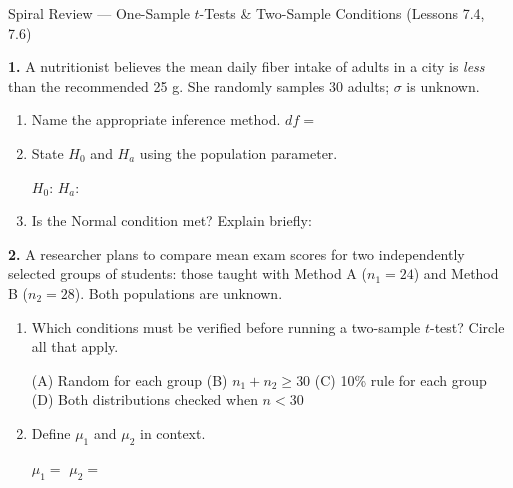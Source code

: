 \documentclass[10pt]{article}
\begin{document}
\namedateperiod

\vspace{0.10in}

\begin{notesbox}{Spiral Review --- One-Sample $t$-Tests \& Two-Sample Conditions (Lessons 7.4, 7.6)}

\textbf{1.} A nutritionist believes the mean daily fiber intake of adults in a city is
\emph{less} than the recommended 25 g. She randomly samples 30 adults; $\sigma$ is unknown.

\begin{enumerate}[label=\alph*.]
  \item Name the appropriate inference method. \blank{5cm} \quad $df = $ \blank{1.5cm}
  \item State $H_0$ and $H_a$ using the population parameter.

        $H_0$: \blank{4cm} \qquad $H_a$: \blank{4cm}
  \item Is the Normal condition met? \blank{1.5cm} \; Explain briefly: \writeline
\end{enumerate}

\vspace{0.08in}
\textbf{2.} A researcher plans to compare mean exam scores for two independently selected
groups of students: those taught with Method A ($n_1 = 24$) and Method B ($n_2 = 28$).
Both populations are unknown.

\begin{enumerate}[label=\alph*.]
  \item Which conditions must be verified before running a two-sample $t$-test? Circle all that apply.

        \quad (A) Random for each group \quad
        (B) $n_1 + n_2 \ge 30$ \quad
        (C) 10\% rule for each group \quad
        (D) Both distributions checked when $n < 30$

  \item Define $\mu_1$ and $\mu_2$ in context.

        $\mu_1 = $ \blank{5.5cm} \qquad $\mu_2 = $ \blank{5.5cm}
\end{enumerate}

\end{notesbox}
\end{document}

